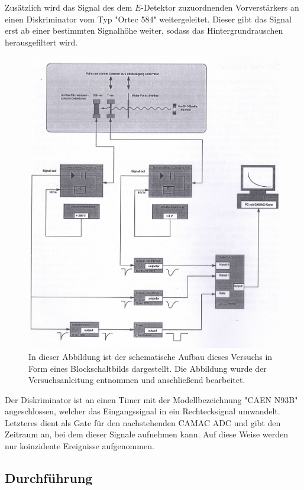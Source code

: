 Zusätzlich wird das Signal des dem $E$-Detektor zuzuordnenden Vorverstärkers an einen Diskriminator vom Typ "Ortec 584" weitergeleitet.
Dieser gibt das Signal erst ab einer bestimmten Signalhöhe weiter, sodass das Hintergrundrauschen herausgefiltert wird.
\begin{figure}[H]
	\centering
	\includegraphics[width=\textwidth]{img/Aufbau}
	\caption{In dieser Abbildung ist der schematische Aufbau dieses Versuchs in Form eines Blockschaltbilds dargestellt. Die Abbildung wurde der Versuchsanleitung\cite{wwu} entnommen und anschließend bearbeitet.}
	\label{Aufbau}
\end{figure}
Der Diskriminator ist an einen Timer mit der Modellbezeichnung "CAEN N93B" angeschlossen, welcher das Eingangssignal in ein Rechtecksignal umwandelt.
Letzteres dient als Gate für den nachstehenden CAMAC ADC und gibt den Zeitraum an, bei dem dieser Signale aufnehmen kann.
Auf diese Weise werden nur koinzidente Ereignisse aufgenommen.

\subsection{Durchführung}

